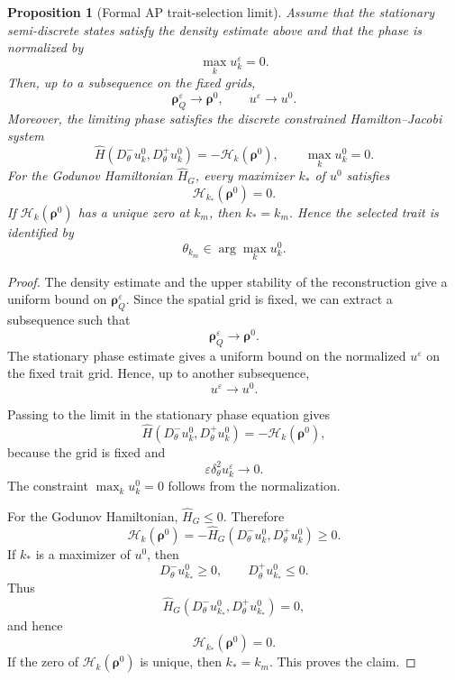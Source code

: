 \documentclass[11pt, dina4, amsfont12]{article}
\newtheorem{proposition}{Proposition}[section]
\begin{document}
\begin{proposition}[Formal AP trait-selection limit]
\label{prop:formal_AP_trait_selection}
Assume that the stationary semi-discrete states satisfy the density estimate
above and that the phase is normalized by
\[
    \max_k u_k^\varepsilon=0 .
\]
Then, up to a subsequence on the fixed grids,
\[
    \boldsymbol\rho_Q^\varepsilon\to \boldsymbol\rho^0,
    \qquad
    u^\varepsilon\to u^0 .
\]
Moreover, the limiting phase satisfies the discrete constrained
Hamilton--Jacobi system
\[
    \widehat H
    \left(
        D_\theta^-u_k^0,
        D_\theta^+u_k^0
    \right)
    =
    -\mathcal H_k(\boldsymbol\rho^0),
    \qquad
    \max_k u_k^0=0 .
\]
For the Godunov Hamiltonian \(\widehat H_G\), every maximizer \(k_*\) of
\(u^0\) satisfies
\[
    \mathcal H_{k_*}(\boldsymbol\rho^0)=0.
\]
If \(\mathcal H_k(\boldsymbol\rho^0)\) has a unique zero at \(k_m\), then
\(k_*=k_m\). Hence the selected trait is identified by
\[
    \theta_{k_m}\in \arg\max_k u_k^0 .
\]
\end{proposition}

\begin{proof}
The density estimate and the upper stability of the reconstruction give a
uniform bound on \(\boldsymbol\rho_Q^\varepsilon\). Since the spatial grid is
fixed, we can extract a subsequence such that
\[
    \boldsymbol\rho_Q^\varepsilon\to \boldsymbol\rho^0 .
\]
The stationary phase estimate gives a uniform bound on the normalized
\(u^\varepsilon\) on the fixed trait grid. Hence, up to another subsequence,
\[
    u^\varepsilon\to u^0 .
\]

Passing to the limit in the stationary phase equation gives
\[
    \widehat H
    \left(
        D_\theta^-u_k^0,
        D_\theta^+u_k^0
    \right)
    =
    -\mathcal H_k(\boldsymbol\rho^0),
\]
because the grid is fixed and
\[
    \varepsilon\delta_\theta^2u_k^\varepsilon\to0 .
\]
The constraint \(\max_k u_k^0=0\) follows from the normalization.

For the Godunov Hamiltonian, \(\widehat H_G\le0\). Therefore
\[
    \mathcal H_k(\boldsymbol\rho^0)
    =
    -
    \widehat H_G
    \left(
        D_\theta^-u_k^0,
        D_\theta^+u_k^0
    \right)
    \ge0 .
\]
If \(k_*\) is a maximizer of \(u^0\), then
\[
    D_\theta^-u_{k_*}^0\ge0,
    \qquad
    D_\theta^+u_{k_*}^0\le0.
\]
Thus
\[
    \widehat H_G
    \left(
        D_\theta^-u_{k_*}^0,
        D_\theta^+u_{k_*}^0
    \right)=0,
\]
and hence
\[
    \mathcal H_{k_*}(\boldsymbol\rho^0)=0.
\]
If the zero of \(\mathcal H_k(\boldsymbol\rho^0)\) is unique, then
\(k_*=k_m\). This proves the claim.
\end{proof}
\end{document}
